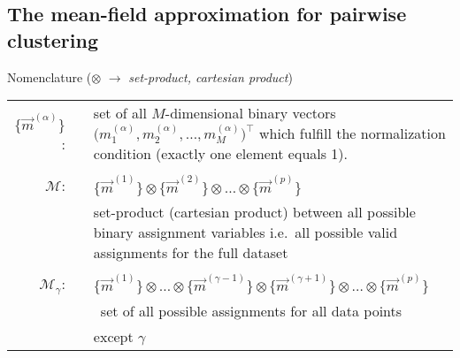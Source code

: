 \begin{frame}
\section{The mean-field approximation for pairwise clustering}
 Nomenclature ($\otimes$ $\rightarrow$ \emph{set-product, cartesian product})\\
 
 \begin{tabular}{r l p{9cm}}
$\big\{ \vec{m}^{(\alpha)} \big\}$: & & set of all $M$-dimensional binary vectors $\big( m_1^{(\alpha)}, m_2^{(\alpha)}, \ldots, 
  m_M^{(\alpha)} \big)^\top$ which fulfill the normalization condition (exactly one element equals 1). \\\\
$\mathscr{M}$: & & $\big\{ \vec{m}^{(1)} \big\} \otimes \big\{ \vec{m}^{(2)} \big\} \otimes \ldots \otimes \big\{ \vec{m}^{(p)} \big\}$\\
& & set-product (cartesian product) between all possible binary assignment variables i.e.\ all possible valid assignments for the full dataset\\\\
$\mathscr{M}_{\gamma}$:& &  $\big\{ \vec{m}^{(1)} \big\} \otimes \ldots \otimes \big\{ \vec{m}^{(\gamma - 1)} \big\} \otimes
  \big\{ \vec{m}^{(\gamma + 1)} \big\} \otimes \ldots \otimes
  \big\{ \vec{m}^{(p)} \big\}$\\
& &\  set of all possible assignments for all data points  \\& & \hspace{0.03cm} except $\gamma$
\end{tabular}

\end{frame}

